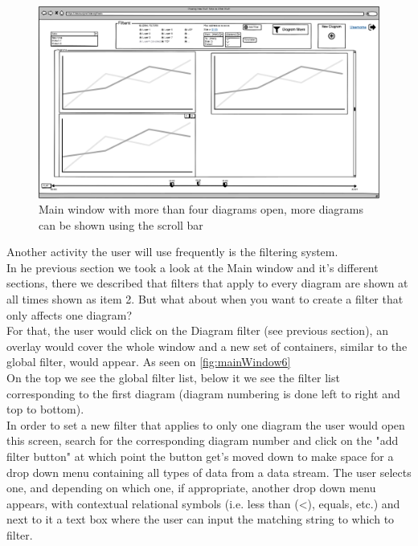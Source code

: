 \documentclass[twoside, english, draft]{Pflichtenheft}
\begin{document}
\begin{figure}[h]
	\centering
	\label{fig:mainWindow4}
	\includegraphics[width=\textwidth]{Images/06MW.png}
	\caption{Main window with more than four diagrams open, more diagrams can be shown using the scroll bar}
	\label{fig:mainWindow4}
\end{figure}

Another activity the user will use frequently is the filtering system.
\\
In he previous section we took a look at the Main window and it's different sections, there we described that filters that apply to every diagram are shown at all times shown as item 2. But what about when you want to create a filter that only affects one diagram?
\\
For that, the user would click on the Diagram filter (see previous section), an overlay would cover the whole window and a new set of containers, similar to the global filter, would appear. As seen on \autoref{fig:mainWindow6}
\\
On the top we see the global filter list, below it we see the filter list corresponding to the first diagram (diagram numbering is done left to right and top to bottom).
\\
In order to set a new filter that applies to only one diagram the user would open this screen, search for the corresponding diagram number and click on the "add filter button" at which point the button get's moved down to make space for a drop down menu containing all types of data from a data stream. The user selects one, and depending on which one, if appropriate, another drop down menu appears, with contextual relational symbols (i.e. less than (<), equals, etc.) and next to it a text box where the user can input the matching string to which to filter.
\end{document}
